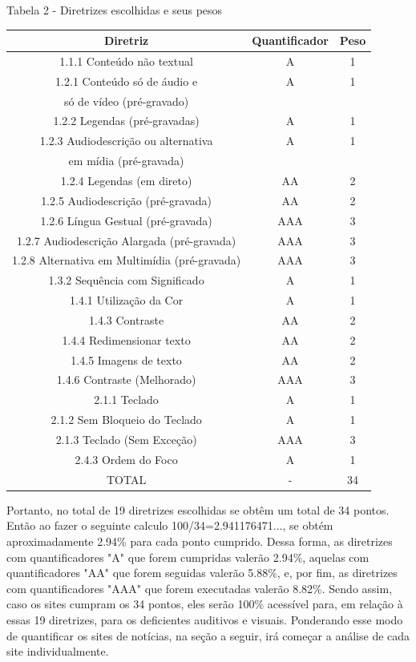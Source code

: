 \documentclass[a4paper]{article}
\begin{document}
\begin{titlepage}
Tabela 2 - Diretrizes escolhidas e seus pesos\\[-1cm]
\begin{center}
	\fontsize{8pt}{8pt}\selectfont
	\begin{longtable}{|c|c|c|}
		\hline
		Diretriz & Quantificador & Peso\\
		\hline
		1.1.1 Conteúdo não textual & A & 1\\
		\hline
		1.2.1 Conteúdo só de áudio e & A & 1\\
		só de vídeo (pré-gravado) & & \\
		\hline
		1.2.2 Legendas (pré-gravadas) & A & 1\\
		\hline
		1.2.3 Audiodescrição ou alternativa & A & 1\\
		em mídia (pré-gravada) & & \\
		\hline
		1.2.4 Legendas (em direto) & AA & 2\\
		\hline
		1.2.5 Audiodescrição (pré-gravada) & AA & 2\\
		\hline
		1.2.6 Língua Gestual (pré-gravada) & AAA & 3\\
		\hline
		1.2.7 Audiodescrição Alargada (pré-gravada) & AAA & 3\\
		\hline
		1.2.8 Alternativa em Multimídia (pré-gravada) & AAA & 3\\
		\hline
		1.3.2 Sequência com Significado & A & 1\\
		\hline
		1.4.1 Utilização da Cor & A & 1\\
		\hline
		1.4.3 Contraste & AA & 2\\
		\hline
		1.4.4 Redimensionar texto & AA & 2\\
		\hline
		1.4.5 Imagens de texto & AA & 2\\
		\hline
		1.4.6 Contraste (Melhorado) & AAA & 3\\
		\hline
		2.1.1 Teclado & A & 1\\
		\hline
		2.1.2 Sem Bloqueio do Teclado & A & 1\\
		\hline
		2.1.3 Teclado (Sem Exceção) & AAA & 3\\
		\hline
		2.4.3 Ordem do Foco & A & 1\\
		\hline
		TOTAL & - & 34\\
		\hline
	\end{longtable}
\end{center}

Portanto, no total de 19 diretrizes escolhidas se obtêm um total de 34 pontos. Então ao fazer o seguinte calculo 100/34=2.941176471..., se obtém aproximadamente 2.94\% para cada ponto cumprido. Dessa forma, as diretrizes com quantificadores "A" que forem cumpridas valerão 2.94\%, aquelas com quantificadores "AA" que forem seguidas valerão 5.88\%, e, por fim, as diretrizes com quantificadores "AAA" que forem executadas valerão 8.82\%. Sendo assim, caso os sites cumpram os 34 pontos, eles serão 100\% acessível para, em relação à essas 19 diretrizes, para os deficientes auditivos e visuais. Ponderando esse modo de quantificar os sites de notícias, na seção a seguir, irá começar a análise de cada site individualmente.


\end{titlepage}
\end{document}
